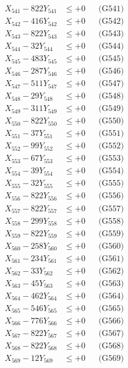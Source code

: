 \documentclass[a4paper,10pt]{article}
\begin{document}
{\begin{align}
\allowbreak
X_{541} - 822Y_{541} &\leq +0 && \text{(G541)} \\
X_{542} - 416Y_{542} &\leq +0 && \text{(G542)} \\
X_{543} - 822Y_{543} &\leq +0 && \text{(G543)} \\
X_{544} - 32Y_{544} &\leq +0 && \text{(G544)} \\
X_{545} - 483Y_{545} &\leq +0 && \text{(G545)} \\
X_{546} - 287Y_{546} &\leq +0 && \text{(G546)} \\
X_{547} - 511Y_{547} &\leq +0 && \text{(G547)} \\
X_{548} - 29Y_{548} &\leq +0 && \text{(G548)} \\
X_{549} - 311Y_{549} &\leq +0 && \text{(G549)} \\
X_{550} - 822Y_{550} &\leq +0 && \text{(G550)} \\
\allowbreak
X_{551} - 37Y_{551} &\leq +0 && \text{(G551)} \\
X_{552} - 99Y_{552} &\leq +0 && \text{(G552)} \\
X_{553} - 67Y_{553} &\leq +0 && \text{(G553)} \\
X_{554} - 39Y_{554} &\leq +0 && \text{(G554)} \\
X_{555} - 32Y_{555} &\leq +0 && \text{(G555)} \\
X_{556} - 822Y_{556} &\leq +0 && \text{(G556)} \\
X_{557} - 822Y_{557} &\leq +0 && \text{(G557)} \\
X_{558} - 299Y_{558} &\leq +0 && \text{(G558)} \\
X_{559} - 822Y_{559} &\leq +0 && \text{(G559)} \\
X_{560} - 258Y_{560} &\leq +0 && \text{(G560)} \\
\allowbreak
X_{561} - 234Y_{561} &\leq +0 && \text{(G561)} \\
X_{562} - 33Y_{562} &\leq +0 && \text{(G562)} \\
X_{563} - 45Y_{563} &\leq +0 && \text{(G563)} \\
X_{564} - 462Y_{564} &\leq +0 && \text{(G564)} \\
X_{565} - 546Y_{565} &\leq +0 && \text{(G565)} \\
X_{566} - 776Y_{566} &\leq +0 && \text{(G566)} \\
X_{567} - 822Y_{567} &\leq +0 && \text{(G567)} \\
X_{568} - 822Y_{568} &\leq +0 && \text{(G568)} \\
X_{569} - 12Y_{569} &\leq +0 && \text{(G569)} \\

\end{align}}
\end{document}

